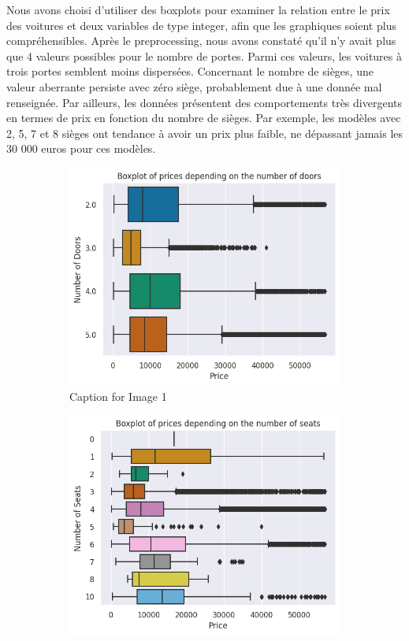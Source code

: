 \documentclass[12pt]{article}
\begin{document}
Nous avons choisi d'utiliser des boxplots pour examiner la relation entre le prix des voitures et deux variables de type integer, afin que les graphiques soient plus compréhensibles. Après le preprocessing, nous avons constaté qu'il n'y avait plus que 4 valeurs possibles pour le nombre de portes. Parmi ces valeurs, les voitures à trois portes semblent moins dispersées. Concernant le nombre de sièges, une valeur aberrante persiste avec zéro siège, probablement due à une donnée mal renseignée. Par ailleurs, les données présentent des comportements très divergents en termes de prix en fonction du nombre de sièges. Par exemple, les modèles avec 2, 5, 7 et 8 sièges ont tendance à avoir un prix plus faible, ne dépassant jamais les 30 000 euros pour ces modèles.

\FloatBarrier
\begin{figure}[ht]
  \centering
  \begin{subfigure}{0.48\textwidth}
    \includegraphics[width=\linewidth]{number of doors.png}
    \caption{Caption for Image 1}
    \label{fig:image1}
  \end{subfigure}
  \hfill
  \begin{subfigure}{0.48\textwidth}
    \includegraphics[width=\linewidth]{number of seats.png}

\end{subfigure}
\end{figure}
\end{document}
